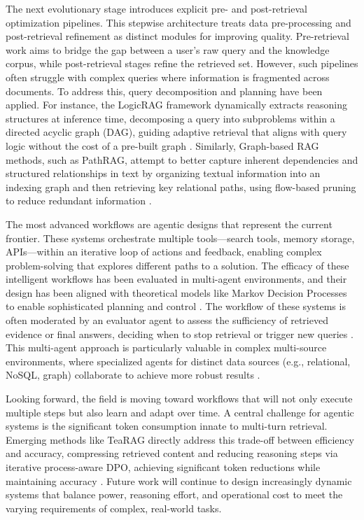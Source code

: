 \documentclass[11pt,a4paper]{article}
\begin{document}
The next evolutionary stage introduces explicit pre- and post-retrieval optimization pipelines. This stepwise architecture treats data pre-processing and post-retrieval refinement as distinct modules for improving quality. Pre-retrieval work aims to bridge the gap between a user's raw query and the knowledge corpus, while post-retrieval stages refine the retrieved set. However, such pipelines often struggle with complex queries where information is fragmented across documents. To address this, query decomposition and planning have been applied. For instance, the LogicRAG framework dynamically extracts reasoning structures at inference time, decomposing a query into subproblems within a directed acyclic graph (DAG), guiding adaptive retrieval that aligns with query logic without the cost of a pre-built graph \cite{arxiv:2508.06105v2}. Similarly, Graph-based RAG methods, such as PathRAG, attempt to better capture inherent dependencies and structured relationships in text by organizing textual information into an indexing graph and then retrieving key relational paths, using flow-based pruning to reduce redundant information \cite{arxiv:2502.14902v2}.

The most advanced workflows are agentic designs that represent the current frontier. These systems orchestrate multiple tools---search tools, memory storage, APIs---within an iterative loop of actions and feedback, enabling complex problem-solving that explores different paths to a solution. The efficacy of these intelligent workflows has been evaluated in multi-agent environments, and their design has been aligned with theoretical models like Markov Decision Processes to enable sophisticated planning and control \cite{arxiv:2412.05838v1}. The workflow of these systems is often moderated by an evaluator agent to assess the sufficiency of retrieved evidence or final answers, deciding when to stop retrieval or trigger new queries \cite{arxiv:2412.05838v1}. This multi-agent approach is particularly valuable in complex multi-source environments, where specialized agents for distinct data sources (e.g., relational, NoSQL, graph) collaborate to achieve more robust results \cite{arxiv:2412.05838v1}.

Looking forward, the field is moving toward workflows that will not only execute multiple steps but also learn and adapt over time. A central challenge for agentic systems is the significant token consumption innate to multi-turn retrieval. Emerging methods like TeaRAG directly address this trade-off between efficiency and accuracy, compressing retrieved content and reducing reasoning steps via iterative process-aware DPO, achieving significant token reductions while maintaining accuracy \cite{arxiv:2511.05385v2}. Future work will continue to design increasingly dynamic systems that balance power, reasoning effort, and operational cost to meet the varying requirements of complex, real-world tasks.
\end{document}
